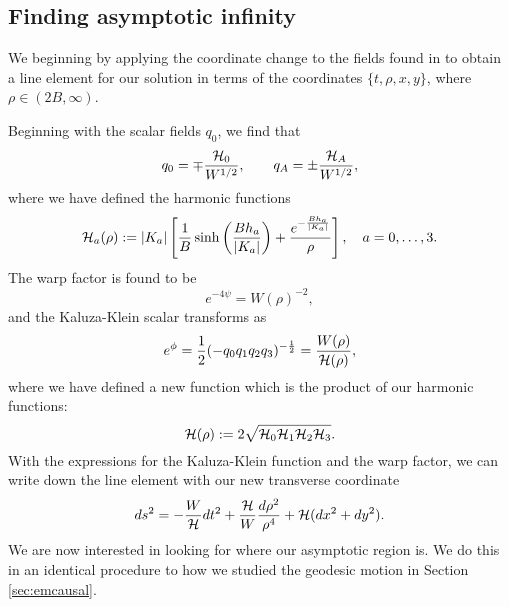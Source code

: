 \subsection{Finding asymptotic infinity}

We beginning by applying the coordinate change  to the fields found in  to obtain a line element for our solution in terms of the coordinates $\{t, \rho, x, y\}$, where $\rho \in (2B, \infty)$. 

Beginning with the scalar fields $q_0$, we find that
\begin{equation}
q_0 = \mp \frac{{\cal H}_0}{W^{1/2}},  \qquad q_A = \pm \frac{{\cal H}_A}{W^{1/2}},
\end{equation}
where we have defined the harmonic functions
\begin{equation*}
{\cal H}_a(\rho) := | K_a | \left[\frac{1}{B} \sinh \bigg(\frac{B h_a}{|K_a|}\bigg) + \frac{e^{-\frac{B h_a}{|K_a|}}}{\rho} \right], \quad a=0,\ldots, 3.
\end{equation*}
The warp factor is found to be
\begin{equation*}
  e^{-4\psi} = W(\rho)^{-2},
\end{equation*}
and the Kaluza-Klein scalar transforms as
\begin{equation}
\label{eq:4cmdf2}
    e^\phi = \frac{1}{2} (-q_0 q_1 q_2 q_3)^{-\frac{1}{2}} = \frac{W(\rho)}{{\cal H}(\rho)},
\end{equation}
where we have defined a new function which is the product of our harmonic functions:
\begin{equation}
{\cal H} (\rho) := 2 \sqrt{{\cal H}_0 {\cal H}_1 {\cal H}_2 {\cal H}_3}    .
\end{equation}
With the expressions for the Kaluza-Klein function and the warp factor, we can write down the line element with our new transverse coordinate
\begin{equation}
\label{eq:4chargerho}
ds^2 = -\frac{W}{{\cal H}} dt^2 +\frac{{\cal H}}{W} \frac{d\rho^2}{\rho^4} + {\cal H} (dx^2 + dy^2).
\end{equation}
We are now interested in looking for where our asymptotic region is. We do this in an identical procedure to how we studied the geodesic motion in Section \ref{sec:emcausal}.

